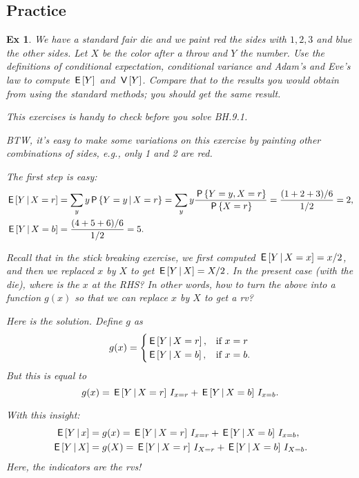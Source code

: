 \documentclass[a4paper,11pt]{article}
\newtheorem{exercise}[theorem]{Ex}
\begin{document}
\subsection{Practice}
\label{sec:practice}




\begin{exercise}
We have a standard fair die and we paint red the sides with $1, 2, 3$ and blue the other sides.
Let $X$ be the color after a throw and $Y$ the number.
Use the definitions of conditional expectation, conditional variance and Adam's and Eve's law to compute $\,\mathsf{E}\left[Y\right]$ and $\,\mathsf{V}\left[Y\right]$.
Compare that to the results you would obtain from using the standard methods; you should get the same result.

This exercises is handy to check before you solve BH.9.1.


BTW, it's easy to make some variations on this exercise by painting other combinations of sides, e.g., only 1 and 2 are red.
\begin{solution}
The first step is easy:
\begin{align}
\,\mathsf{E}\left[Y\,\middle|\, X=r\right] &= \sum_{y} y \,\mathsf{P}\left\{Y=y\,\middle|\, X=r\right\} = \sum_{y} y \frac{\,\mathsf{P}\left\{Y=y,  X=r\right\}}{\,\mathsf{P}\left\{X=r\right\}} = \frac{(1+2+3)/6}{1/2}  = 2, \\
\,\mathsf{E}\left[Y\,\middle|\, X=b\right] &= \frac{(4 + 5+ 6)/6}{1/2}  = 5.
\end{align}

Recall that in the stick breaking exercise, we first computed $\,\mathsf{E}\left[Y\,\middle|\, X = x\right] = x/2$, and then we replaced $x$ by $X$ to get $\,\mathsf{E}\left[Y\,\middle|\, X\right] = X/2$. In the present case (with the die), where is the $x$ at the RHS? In other words, how to turn the above into a function $g(x)$ so that we can replace $x$ by $X$ to get a rv?


Here is the solution. Define $g$ as
\begin{equation}
  \label{eq:111}
  g(x) =
  \begin{cases}
    \,\mathsf{E}\left[Y\,\middle|\, X=r\right], & \text{if } x = r \\
    \,\mathsf{E}\left[Y\,\middle|\, X=b\right], & \text{if } x = b.
  \end{cases}
\end{equation}
But this is equal to
\begin{equation}
  \label{eq:112}
  g(x) = \,\mathsf{E}\left[Y\,\middle|\, X=r\right] \,I_{x=r} + \,\mathsf{E}\left[Y\,\middle|\, X=b\right] \,I_{x=b}.
\end{equation}

With this insight:
\begin{align*}
\,\mathsf{E}\left[Y\,\middle|\, x\right] &=  g(x) = \,\mathsf{E}\left[Y\,\middle|\, X=r\right] \,I_{x=r} + \,\mathsf{E}\left[Y\,\middle|\, X=b\right] \,I_{x=b}, \\
\,\mathsf{E}\left[Y\,\middle|\, X\right] &=  g(X) = \,\mathsf{E}\left[Y\,\middle|\, X=r\right] \,I_{X=r} + \,\mathsf{E}\left[Y\,\middle|\, X=b\right] \,I_{X=b}.
\end{align*}
Here, the indicators are the rvs!


\end{solution}
\end{exercise}
\end{document}
